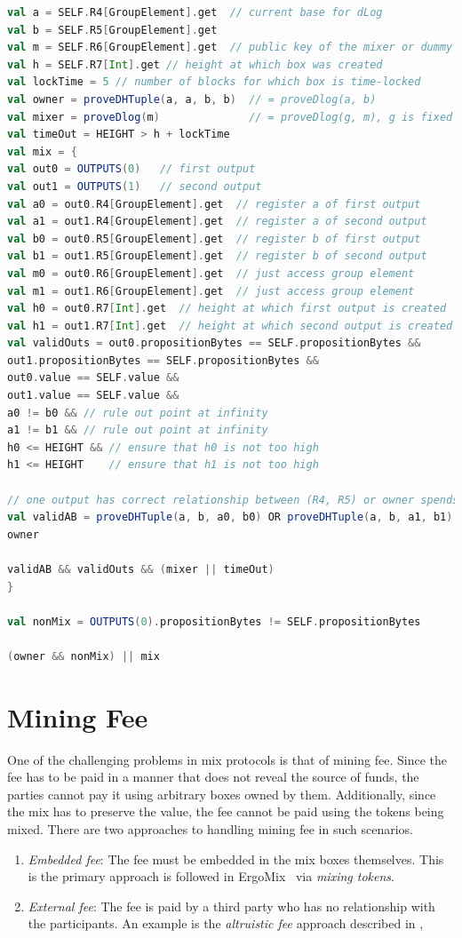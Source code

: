 \documentclass[runningheads]{llncs}
\newcommand{\ergomix}{ErgoMix\xspace}
\begin{document}
\begin{lstlisting}[language=Scala,caption={Mix-script with Stealth Transfers},label=stealthTransfer]
val a = SELF.R4[GroupElement].get  // current base for dLog
val b = SELF.R5[GroupElement].get
val m = SELF.R6[GroupElement].get  // public key of the mixer or dummy value
val h = SELF.R7[Int].get // height at which box was created
val lockTime = 5 // number of blocks for which box is time-locked
val owner = proveDHTuple(a, a, b, b)  // = proveDlog(a, b)
val mixer = proveDlog(m)              // = proveDlog(g, m), g is fixed
val timeOut = HEIGHT > h + lockTime
val mix = {
val out0 = OUTPUTS(0)   // first output
val out1 = OUTPUTS(1)   // second output
val a0 = out0.R4[GroupElement].get  // register a of first output
val a1 = out1.R4[GroupElement].get  // register a of second output
val b0 = out0.R5[GroupElement].get  // register b of first output
val b1 = out1.R5[GroupElement].get  // register b of second output
val m0 = out0.R6[GroupElement].get  // just access group element
val m1 = out1.R6[GroupElement].get  // just access group element
val h0 = out0.R7[Int].get  // height at which first output is created
val h1 = out1.R7[Int].get  // height at which second output is created
val validOuts = out0.propositionBytes == SELF.propositionBytes &&
out1.propositionBytes == SELF.propositionBytes &&
out0.value == SELF.value &&
out1.value == SELF.value &&
a0 != b0 && // rule out point at infinity
a1 != b1 && // rule out point at infinity
h0 <= HEIGHT && // ensure that h0 is not too high
h1 <= HEIGHT    // ensure that h1 is not too high

// one output has correct relationship between (R4, R5) or owner spends
val validAB = proveDHTuple(a, b, a0, b0) OR proveDHTuple(a, b, a1, b1) OR
owner

validAB && validOuts && (mixer || timeOut)
}

val nonMix = OUTPUTS(0).propositionBytes != SELF.propositionBytes

(owner && nonMix) || mix
\end{lstlisting}

\section{Mining Fee}

One of the challenging problems in mix protocols is that of mining fee. Since the fee has to be paid in a manner that does not reveal the source of funds, the parties cannot pay it using arbitrary boxes owned by them. Additionally, since the mix has to preserve the value, the fee cannot be paid using the tokens being mixed. There are two approaches to handling mining fee in such scenarios.
\begin{enumerate}
\item {\em Embedded fee}: The fee must be embedded in the mix boxes themselves. This is the primary approach is followed in \ergomix~\cite{zerojoin} via {\em mixing tokens}.
\item {\em External fee}: The fee is paid by a third party who has no relationship with the participants. An example is the {\em altruistic fee} approach described in \cite{zerojoin},
\end{enumerate}
\end{document}
